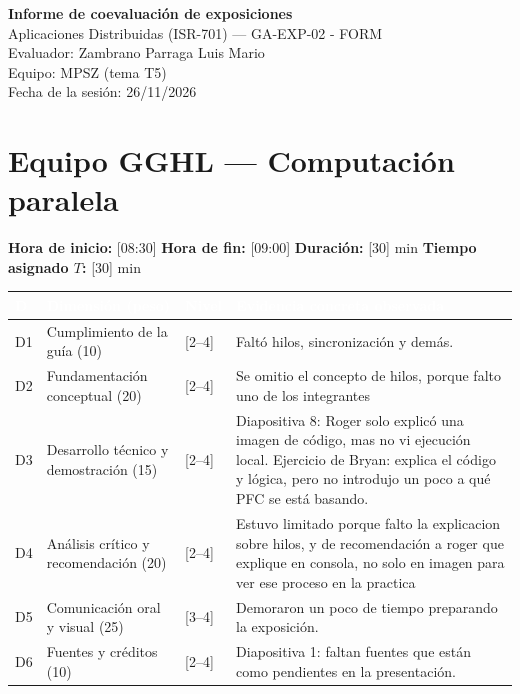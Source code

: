 \documentclass[11pt,a4paper]{article}
\newcommand{\hdr}[1]{\textcolor{white}{\textbf{#1}}}
\begin{document}
\begin{center}
    {\Large\bfseries\color{uteqBlue} Informe de coevaluación de exposiciones}\\[4pt]
    {\large Aplicaciones Distribuidas (ISR-701) --- GA-EXP-02 - FORM}\\[4pt]
    Evaluador: Zambrano Parraga Luis Mario\\
    Equipo: MPSZ (tema T5)\\
    Fecha de la sesión: 26/11/2026
\end{center}


\section{Equipo GGHL --- Computación paralela}

\textbf{Hora de inicio:} [08:30] \quad
\textbf{Hora de fin:} [09:00] \quad
\textbf{Duración:} [30] min \quad
\textbf{Tiempo asignado $T$:} [30] min

\begin{tabularx}{\linewidth}{|C{0.9cm}|L{3.4cm}|C{1.1cm}|Y|}
    \hline
    \hdr{D} & \hdr{Dimensión (peso)} & \hdr{Nivel} &
    \hdr{Evidencia concreta observada} \\
    \hline

    D1 & Cumplimiento de la guía (10) & [2--4] &
    Faltó hilos, sincronización y demás. \\
    \hline

    D2 & Fundamentación conceptual (20) & [2--4] &
    Se omitio el concepto de hilos, porque falto uno de los integrantes\\
    \hline

    D3 & Desarrollo técnico y demostración (15) & [2--4] &
    Diapositiva 8: Roger solo explicó una imagen de código,
    mas no vi ejecución local. Ejercicio de Bryan:
    explica el código y lógica, pero no introdujo un poco
    a qué PFC se está basando. \\
    \hline

    D4 & Análisis crítico y recomendación (20) & [2--4] &
    Estuvo limitado porque falto la explicacion sobre hilos, y de recomendación a roger que explique en consola, no solo en imagen para ver ese proceso en la practica\\
    \hline

    D5 & Comunicación oral y visual (25) & [3--4] &
    Demoraron un poco de tiempo preparando la exposición.\\
    \hline

    D6 & Fuentes y créditos (10) & [2--4] &
    Diapositiva 1: faltan fuentes que están como pendientes
    en la presentación. \\
    \hline

\end{tabularx}
\end{document}
